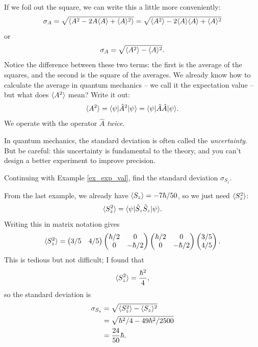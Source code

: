 If we foil out the square, we can write this a little more conveniently:
\[
\sigma_A = \sqrt{\langle A^2 - 2A\langle A \rangle + \langle A \rangle^2  \rangle} = \sqrt{\langle A^2 \rangle - 2\langle A \rangle\langle A \rangle + \langle A \rangle^2}
\]
or
\begin{equation}
\sigma_A = \sqrt{\langle A^2 \rangle - \langle A \rangle^2}.
\end{equation}
Notice the difference between these two terms:  the first is the average of the squares, and the second is the square of the averages.  We already know how to calculate the average in quantum mechanics  -- we call it the expectation value -- but what does $\langle A^2 \rangle$ mean?  Write it out:
\[
\langle A^2 \rangle = \langle \psi | \hat{A}^2 | \psi \rangle = \langle \psi | \hat{A} \hat{A} | \psi \rangle.
\]
We operate with the operator $\hat{A}$ \emph{twice}.

In quantum mechanics, the standard deviation is often called the \emph{uncertainty}.  But be careful: this uncertainty is fundamental to the theory, and you can't design a better experiment to improve precision.

\begin{example}

Continuing with Example \ref{ex_exp_val}, find the standard deviation $\sigma_{S_z}$.

From the last example, we already have $\langle S_z \rangle = -7\hbar/50$, so we just need $\langle S_z^2 \rangle$:
\[
\langle S_z^2 \rangle = \langle \psi | \hat{S}_z \hat{S}_z | \psi \rangle.
\]
Writing this in matrix notation gives
\[
\langle S_z^2 \rangle =
\begin{pmatrix} 3/5 & 4/5 \end{pmatrix} 
\begin{pmatrix} \hbar/2 & 0 \\ 0 & -\hbar/2 \end{pmatrix}
\begin{pmatrix} \hbar/2 & 0 \\ 0 & -\hbar/2 \end{pmatrix}
\begin{pmatrix} 3/5 \\ 4/5 \end{pmatrix}.
\]
This is tedious but not difficult; I found that
\[
\langle S_z^2 \rangle = \frac{\hbar^2}{4},
\]
so the standard deviation is
\begin{align*}
\sigma_{S_z} & = \sqrt{\langle S_z^2 \rangle - \langle S_z \rangle^2} \\
& = \sqrt{\hbar^2 / 4 - 49 \hbar^2/2500} \\
& = \frac{24}{50} \hbar.
\end{align*}
\end{example}



